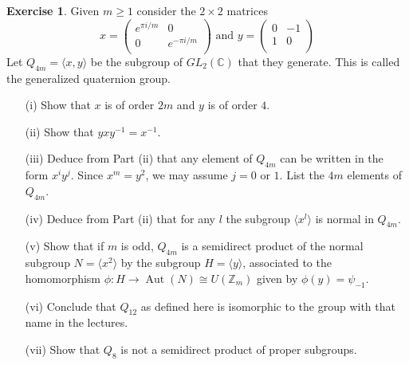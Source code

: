 \documentclass{amsart}
\DeclareMathOperator{\Aut}{Aut}
\newcommand{\xra}{\xrightarrow}
\renewcommand{\:}{\colon}
\newcommand{\ip}[1]{\langle #1\rangle}
\newcommand{\Z}{\mathbb{Z}}
\newcommand{\C}{\mathbb{C}}
\theoremstyle{definition}
\newtheorem{exercise}{Exercise}
\newenvironment{solution}{{\noindent\bf Solution:}}{}
\begin{document}
\begin{exercise}
 Given $m \geq 1$ consider the $2\times 2$ matrices
 \[ x = \left(\begin{array}{cc}
     e^{\pi i/m} & 0             \\
     0           & e^{-\pi i/m}  \\
    \end{array} \right) \mbox{ and }
   y = \left( \begin{array}{cc}
     0           & -1            \\
     1           &  0            \\
    \end{array}\right)
 \]
 Let $Q_{4m}=\ip{x,y}$ be the subgroup of $GL_2(\C)$ that they
 generate. This is called the generalized quaternion group.
 \begin{itemize}
  \item[(i)] Show that $x$ is of order $2m$ and $y$ is of order $4$.
  \item[(ii)] Show that $yxy^{-1}=x^{-1}$.
  \item[(iii)] Deduce from Part (ii) that any element of $Q_{4m}$ can
   be written in the form $x^iy^j$. Since $x^m=y^2$, we may assume
   $j=0$ or $1$. List the $4m$ elements of $Q_{4m}$.
  \item[(iv)] Deduce from Part (ii) that for any $l$ the subgroup
   $\ip{x^l}$ is normal in $Q_{4m}$.
  \item[(v)] Show that if $m$ is odd, $Q_{4m}$ is a semidirect product
   of the normal subgroup $N=\ip{x^2}$ by the subgroup $H=\ip{y}$,
   associated to the homomorphism $\phi\: H\xra{}\Aut(N)\cong U(\Z_m)$
   given by $\phi(y)=\psi_{-1}$.
  \item[(vi)] Conclude that $Q_{12}$ as defined here is isomorphic to
   the group with that name in the lectures.
  \item[(vii)] Show that $Q_8$ is not a semidirect product of proper
   subgroups.
 \end{itemize}
\end{exercise}
\begin{solution}

\end{solution}
\end{document}
